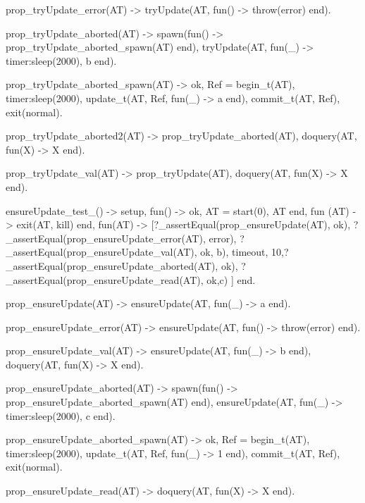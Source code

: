 \documentclass[11pt]{article}
\renewenvironment{verbatim}{}{}
\begin{document}
\begin{verbatim}
prop_tryUpdate_error(AT) ->
    tryUpdate(AT, fun() -> throw(error) end).

prop_tryUpdate_aborted(AT) ->
    spawn(fun() -> prop_tryUpdate_aborted_spawn(AT) end), %spawn competitor
    tryUpdate(AT, fun(_) -> timer:sleep(2000), b end). %sleep 2 seconds
    

prop_tryUpdate_aborted_spawn(AT) ->
    {ok, Ref} =  begin_t(AT),
    timer:sleep(2000), %Sleep a little so tryUpdate gets ahead (but has to run 2 times with function).
    update_t(AT, Ref, fun(_) -> a end),
    commit_t(AT, Ref),
    exit(normal). %kill self

prop_tryUpdate_aborted2(AT) ->
    prop_tryUpdate_aborted(AT),
    doquery(AT, fun(X) -> X end).

prop_tryUpdate_val(AT) ->
    prop_tryUpdate(AT),
    doquery(AT, fun(X) -> X end).


%%% Test ensureUpdate %%%
ensureUpdate_test_() ->
    {setup,
    fun() -> {ok, AT} = start(0), AT end,
    %fun () -> {ok, AT} = start(0) end,
    fun (AT) -> exit(AT, kill) end,
    fun(AT) ->
    [?_assertEqual(prop_ensureUpdate(AT), ok), %Test result if successfull
     ?_assertEqual(prop_ensureUpdate_error(AT), error), %Test result on error function
     ?_assertEqual(prop_ensureUpdate_val(AT), {ok, b}), %Test update actually happens
     {timeout, 10,?_assertEqual(prop_ensureUpdate_aborted(AT), ok)}, %Test update is ensure by trying again first time another commit happens.
     ?_assertEqual(prop_ensureUpdate_read(AT), {ok,c}) %Test if value is updated
    ]
    end}.

%
prop_ensureUpdate(AT) ->
    ensureUpdate(AT, fun(_) -> a end).

prop_ensureUpdate_error(AT) ->
    ensureUpdate(AT, fun() -> throw(error) end).

prop_ensureUpdate_val(AT) ->
    ensureUpdate(AT, fun(_) -> b end),
    doquery(AT, fun(X) -> X end).

prop_ensureUpdate_aborted(AT) ->
    spawn(fun() -> prop_ensureUpdate_aborted_spawn(AT) end), %spawn competitor
    ensureUpdate(AT, fun(_) -> timer:sleep(2000), c end). %sleep 2 seconds
    
prop_ensureUpdate_aborted_spawn(AT) ->
    {ok, Ref} =  begin_t(AT),
    timer:sleep(2000), %Sleep a little so tryUpdate gets ahead.
    update_t(AT, Ref, fun(_) -> 1 end),
    commit_t(AT, Ref),
    exit(normal). %kill self

prop_ensureUpdate_read(AT) ->
    doquery(AT, fun(X) -> X end).



\end{verbatim}
\end{document}
